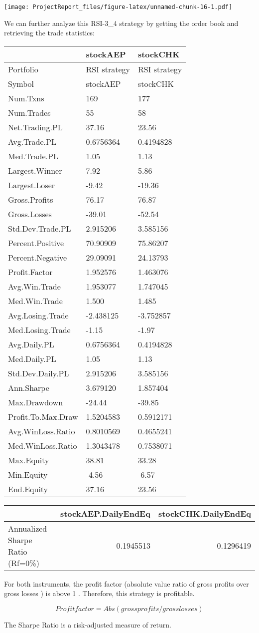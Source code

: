 \documentclass[12pt,]{article}
\begin{document}
\texttt{[image: ProjectReport\_files/figure-latex/unnamed-chunk-16-1.pdf]}

We can further analyze this RSI-3\_4 strategy by getting the order book
and retrieving the trade statistics:

\begin{longtable}[]{@{}lll@{}}
\toprule
& stockAEP & stockCHK\tabularnewline
\midrule
\endhead
Portfolio & RSI strategy & RSI strategy\tabularnewline
Symbol & stockAEP & stockCHK\tabularnewline
Num.Txns & 169 & 177\tabularnewline
Num.Trades & 55 & 58\tabularnewline
Net.Trading.PL & 37.16 & 23.56\tabularnewline
Avg.Trade.PL & 0.6756364 & 0.4194828\tabularnewline
Med.Trade.PL & 1.05 & 1.13\tabularnewline
Largest.Winner & 7.92 & 5.86\tabularnewline
Largest.Loser & -9.42 & -19.36\tabularnewline
Gross.Profits & 76.17 & 76.87\tabularnewline
Gross.Losses & -39.01 & -52.54\tabularnewline
Std.Dev.Trade.PL & 2.915206 & 3.585156\tabularnewline
Percent.Positive & 70.90909 & 75.86207\tabularnewline
Percent.Negative & 29.09091 & 24.13793\tabularnewline
Profit.Factor & 1.952576 & 1.463076\tabularnewline
Avg.Win.Trade & 1.953077 & 1.747045\tabularnewline
Med.Win.Trade & 1.500 & 1.485\tabularnewline
Avg.Losing.Trade & -2.438125 & -3.752857\tabularnewline
Med.Losing.Trade & -1.15 & -1.97\tabularnewline
Avg.Daily.PL & 0.6756364 & 0.4194828\tabularnewline
Med.Daily.PL & 1.05 & 1.13\tabularnewline
Std.Dev.Daily.PL & 2.915206 & 3.585156\tabularnewline
Ann.Sharpe & 3.679120 & 1.857404\tabularnewline
Max.Drawdown & -24.44 & -39.85\tabularnewline
Profit.To.Max.Draw & 1.5204583 & 0.5912171\tabularnewline
Avg.WinLoss.Ratio & 0.8010569 & 0.4655241\tabularnewline
Med.WinLoss.Ratio & 1.3043478 & 0.7538071\tabularnewline
Max.Equity & 38.81 & 33.28\tabularnewline
Min.Equity & -4.56 & -6.57\tabularnewline
End.Equity & 37.16 & 23.56\tabularnewline
\bottomrule
\end{longtable}

\begin{longtable}[]{@{}lrr@{}}
\toprule
& stockAEP.DailyEndEq & stockCHK.DailyEndEq\tabularnewline
\midrule
\endhead
Annualized Sharpe Ratio (Rf=0\%) & 0.1945513 & 0.1296419\tabularnewline
\bottomrule
\end{longtable}

For both instruments, the profit factor (absolute value ratio of gross
profits over gross losses ) is above 1 . Therefore, this strategy is
profitable.

\[Profit factor = Abs( gross profits / gross losses)\]

The Sharpe Ratio is a risk-adjusted measure of return.
\end{document}
